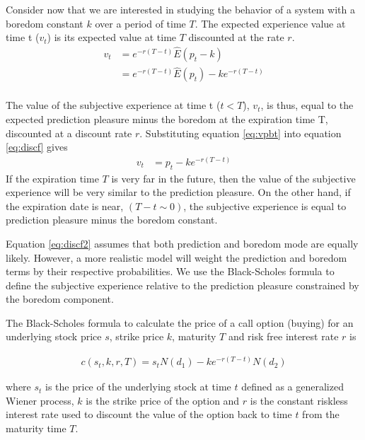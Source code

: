\documentclass[11pt, onecolumn]{article}
\begin{document}
Consider now that we are interested in studying the behavior of a system with a boredom constant $k$ over a period of time $T$. The expected experience value at time t ($v_t$) is its expected value at time $T$ discounted at the rate $r$.  
\begin{equation}
\begin{split}
    v_t  & =  e^{-r(T-t)}\hat{E}(p_{t} - k)  \\
       & = e^{-r(T-t)}\hat{E}(p_{t}) - k e^{-r(T-t)} \\
\end{split}
\label{eq:discf}
\end{equation}

The value of the subjective experience at time t ($t <T$), $v_t$, is thus, equal to the expected prediction pleasure minus the boredom at the expiration time T, discounted at a discount rate $r$. Substituting equation \ref{eq:vpbt} into equation \ref{eq:discf} gives
\begin{equation}
\begin{split}
    v_t  & =  p_{t} - k e^{-r(T-t)}
\end{split}
\label{eq:discf2}
\end{equation}
If the expiration time $T$ is very far in the future, then the value of the subjective experience will be very similar to the prediction pleasure. On the other hand, if the expiration date is near, $(T-t \sim 0)$, the subjective experience is equal to prediction pleasure minus the boredom constant. 

Equation \ref{eq:discf2} assumes that both prediction and boredom mode are equally likely. However, a more realistic model will weight the prediction and boredom terms by their respective probabilities. We use the Black-Scholes formula to define the subjective experience relative to the prediction pleasure constrained by the boredom component. 

The Black-Scholes formula to calculate the price of a call option (buying) for an underlying stock  price $s$, strike price $k$, maturity $T$ and risk free interest rate $r$ is 

\begin{equation}
\begin{split}
 c(s_t,k,r,T)  = s_t N(d_1) - k e^{-r(T-t)}N(d_2)
 \end{split}
  \label{eq:bsmcall}
\end{equation}
 
where $s_t$ is the price of the underlying stock at time $t$ defined as a generalized Wiener process, $k$ is the strike price of the option and $r$ is the constant riskless interest rate used to discount the value of the option back to time $t$ from the maturity time $T$.
\end{document}
